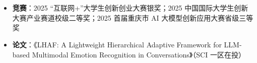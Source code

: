 \documentclass[10pt]{article}
\begin{document}



    \section[在校成果]{}
    \begin{itemize}
        \item \textbf{竞赛}：2025 “互联网+”大学生创新创业大赛银奖；2025 中国国际大学生创新大赛产业赛道校级二等奖；2025 首届重庆市 AI 大模型创新应用大赛省级三等奖
        \item \textbf{论文}：《LHAF: A Lightweight Hierarchical Adaptive Framework for LLM-based Multimodal Emotion Recognition in Conversations》（SCI 一区在投）
    \end{itemize}
\end{document}
